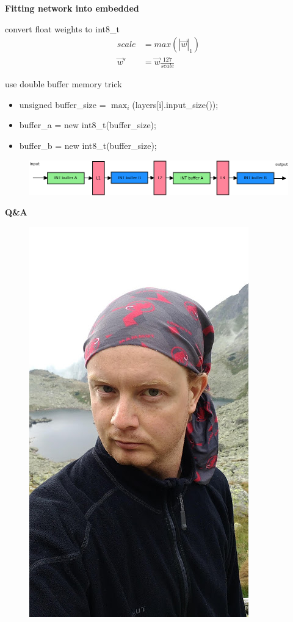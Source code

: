 \documentclass[xcolor=dvipsnames]{beamer}
\begin{document}
\begin{frame}{\bf Fitting network into embedded}

convert float weights to int8\_t
\begin{align*}
  scale &= max{(|\vec{w}|_1)} \\
  \vec{w}' &= \vec{w}\frac{127}{scale}
\end{align*}


use double buffer memory trick

\begin{itemize}
  \item unsigned buffer\_size = $\max_{i}$(layers[i].input\_size());
  \item buffer\_a = new int8\_t(buffer\_size);
  \item buffer\_b = new int8\_t(buffer\_size);
\end{itemize}

\begin{figure}
  \includegraphics[scale=0.3]{../../diagrams/nn_memory.png}
\end{figure}

\end{frame}




\begin{frame}{\bf Q\&A}

\begin{figure}
  \includegraphics[scale=0.25]{../../pictures/me.jpg}
\end{figure}



\end{frame}
\end{document}
